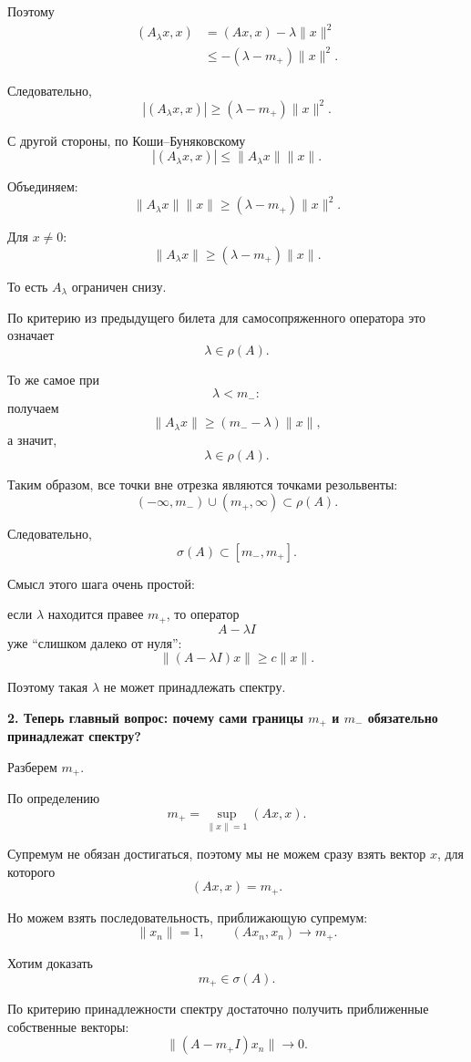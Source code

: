 \begin{idea}
	Поэтому
	\[
	\begin{aligned}
		(A_\lambda x,x)
		&=
		(Ax,x)-\lambda\|x\|^2
		\\
		&\leq
		-(\lambda-m_+)\|x\|^2.
	\end{aligned}
	\]
	
	Следовательно,
	\[
	|(A_\lambda x,x)|
	\geq
	(\lambda-m_+)\|x\|^2.
	\]
	
	С другой стороны, по Коши--Буняковскому
	\[
	|(A_\lambda x,x)|
	\leq
	\|A_\lambda x\|\|x\|.
	\]
	
	Объединяем:
	\[
	\|A_\lambda x\|\|x\|
	\geq
	(\lambda-m_+)\|x\|^2.
	\]
	
	Для \(x\neq0\):
	\[
	\boxed{
		\|A_\lambda x\|
		\geq
		(\lambda-m_+)\|x\|.
	}
	\]
	
	То есть \(A_\lambda\) ограничен снизу.
	
	По критерию из предыдущего билета для самосопряженного оператора
	это означает
	\[
	\lambda\in\rho(A).
	\]
	
	То же самое при
	\[
	\lambda<m_-:
	\]
	получаем
	\[
	\|A_\lambda x\|
	\geq
	(m_--\lambda)\|x\|,
	\]
	а значит,
	\[
	\lambda\in\rho(A).
	\]
	
	Таким образом, все точки вне отрезка являются точками резольвенты:
	\[
	(-\infty,m_-)\cup(m_+,\infty)
	\subset\rho(A).
	\]
	
	Следовательно,
	\[
	\boxed{
		\sigma(A)\subset[m_-,m_+].
	}
	\]
	
	Смысл этого шага очень простой:
	
	если \(\lambda\) находится правее \(m_+\), то оператор
	\[
	A-\lambda I
	\]
	уже ``слишком далеко от нуля'':
	\[
	\|(A-\lambda I)x\|
	\geq c\|x\|.
	\]
	
	Поэтому такая \(\lambda\) не может принадлежать спектру.
	
	\medskip
	
	\textbf{2. Теперь главный вопрос: почему сами границы \(m_+\) и \(m_-\)
		обязательно принадлежат спектру?}
	
	Разберем \(m_+\).
	
	По определению
	\[
	m_+
	=
	\sup_{\|x\|=1}(Ax,x).
	\]
	
	Супремум не обязан достигаться, поэтому мы не можем сразу взять
	вектор \(x\), для которого
	\[
	(Ax,x)=m_+.
	\]
	
	Но можем взять последовательность, приближающую супремум:
	\[
	\|x_n\|=1,
	\qquad
	(Ax_n,x_n)\to m_+.
	\]
	
	Хотим доказать
	\[
	m_+\in\sigma(A).
	\]
	
	По критерию принадлежности спектру достаточно получить
	приближенные собственные векторы:
	\[
	\boxed{
		\|(A-m_+I)x_n\|\to0.
	}
	\]
	

\end{idea}
